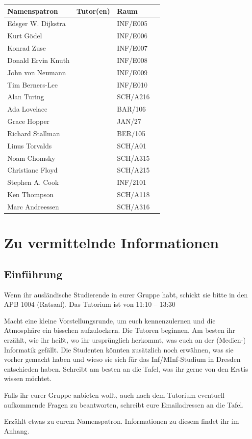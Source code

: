 \documentclass[a4paper,12pt]{report}
\begin{document}
\begin{center}
\vspace{1cm}
\begin{tabular}[h]{|l|l|l|l|}
	\hline
	\textbf{Namenspatron} & \textbf{Tutor(en)} & \textbf{Raum}\\ \hline
	Edsger W. Dijkstra & & INF/E005\\
	Kurt Gödel & & INF/E006\\
	Konrad Zuse & & INF/E007\\
	Donald Ervin Knuth & & INF/E008\\
	John von Neumann & & INF/E009\\
	Tim Berners-Lee & & INF/E010\\
	Alan Turing & & SCH/A216\\
	Ada Lovelace & & BAR/106\\
	Grace Hopper & & JAN/27\\
	Richard Stallman & & BER/105\\
	Linus Torvalds & & SCH/A01\\
	Noam Chomsky & & SCH/A315\\
	Christiane Floyd & & SCH/A215\\
	Stephen A. Cook & & INF/2101\\
	Ken Thompson & & SCH/A118\\
	Marc Andreessen & & SCH/A316\\
	\hline
\end{tabular}
\end{center}

\chapter{Zu vermittelnde Informationen}

\section{Einführung}
\begin{itemize*}
\item Wenn ihr ausländische Studierende in eurer Gruppe habt, schickt sie bitte in den APB 1004 (Ratsaal). Das Tutorium ist von 11:10 – 13:30\\
\item Macht eine kleine Vorstellungsrunde, um euch kennenzulernen und die Atmosphäre ein bisschen aufzulockern.
Die Tutoren beginnen.
Am besten ihr erzählt, wie ihr heißt, wo ihr ursprünglich herkommt, was euch an der (Medien-) Informatik gefällt.
Die Studenten könnten zusätzlich noch erwähnen, was sie vorher gemacht haben und wieso sie sich für das Inf/MInf-Studium in Dresden entschieden haben.
Schreibt am besten an die Tafel, was ihr gerne von den Erstis wissen möchtet.
\item Falls ihr eurer Gruppe anbieten wollt, auch nach dem Tutorium eventuell aufkommende Fragen zu beantworten, schreibt eure Emailadressen an die Tafel.
\item Erzählt etwas zu eurem Namenspatron. Informationen zu diesem findet ihr im Anhang.
\end{itemize*}
\end{document}
